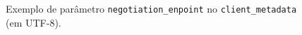 \begin{figure}[htb]
    \caption{Exemplo de parâmetro \texttt{negotiation\_enpoint} no \texttt{client\_metadata} (em UTF-8).}
    \centering
    
    \label{fig:negotiation-endpoint}
\end{figure}